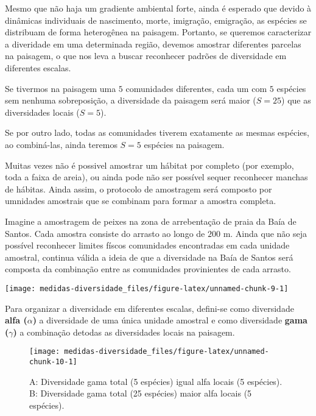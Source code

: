 \documentclass[
]{book}
\begin{document}
Mesmo que não haja um gradiente ambiental forte, ainda é esperado que devido à dinâmicas individuais de nascimento, morte, imigração, emigração, as espécies se distribuam de forma heterogênea na paisagem. Portanto, se queremos caracterizar a diveridade em uma determinada região, devemos amostrar diferentes parcelas na paisagem, o que nos leva a buscar reconhecer padrões de diversidade em diferentes escalas.

Se tivermos na paisagem uma \(5\) comunidades diferentes, cada um com \(5\) espécies sem nenhuma sobreposição, a diversidade da paisagem será maior (\(S = 25\)) que as diversidades locais (\(S = 5\)).

Se por outro lado, todas as comunidades tiverem exatamente as mesmas espécies, ao combiná-las, ainda teremos \(S = 5\) espécies na paisagem.

Muitas vezes não é possivel amostrar um hábitat por completo (por exemplo, toda a faixa de areia), ou ainda pode não ser possível sequer reconhecer manchas de hábitas. Ainda assim, o protocolo de amostragem será composto por umnidades amostrais que se combinam para formar a amostra completa.

Imagine a amostragem de peixes na zona de arrebentação de praia da Baía de Santos. Cada amostra consiste do arrasto ao longo de \(200\) m. Ainda que não seja possível reconhecer limites físcos comunidades encontradas em cada unidade amostral, continua válida a ideia de que a diversidade na Baía de Santos será composta da combinação entre as comunidades provinientes de cada arrasto.

\begin{center}\texttt{[image: medidas-diversidade\_files/figure-latex/unnamed-chunk-9-1]} \end{center}

Para organizar a diversidade em diferentes escalas, defini-se como diversidade \textbf{alfa (\(\alpha\))} a diversidade de uma única unidade amostral e como diversidade \textbf{gama (\(\gamma\))} a combinação detodas as diversidades locais na paisagem.

\begin{figure}

{\centering \texttt{[image: medidas-diversidade\_files/figure-latex/unnamed-chunk-10-1]} 

}

\caption{A: Diversidade gama total (5 espécies) igual alfa locais (5 espécies). B: Diversidade gama total (25 espécies) maior alfa locais (5 espécies).}\label{fig:unnamed-chunk-10}
\end{figure}
\end{document}
